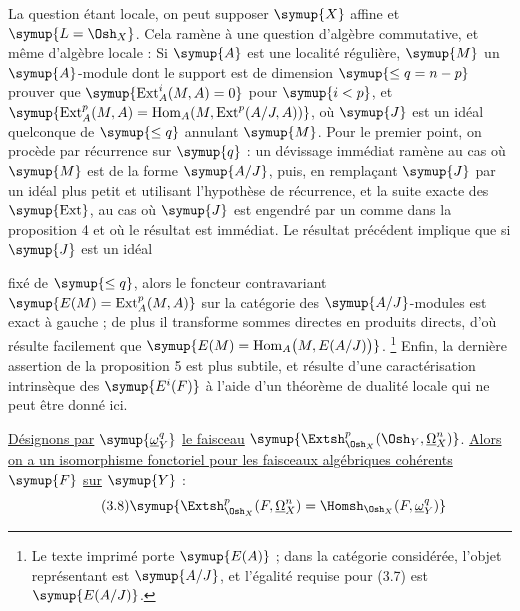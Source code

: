 La question étant locale, on peut supposer $\symup{X}$ affine et $\symup{L=\Osh_X}$. Cela ramène
à une question d'algèbre commutative, et même d'algèbre locale : Si $\symup{A}$ est une
localité régulière, $\symup{M}$ un $\symup{A}$-module dont le support est de dimension
$\symup{\leq q=n-p}$ prouver que $\symup{\operatorname{Ext}_{A}^{i}(M,A)=0}$ pour $\symup{i<p}$, et
$\symup{\operatorname{Ext}_{A}^{p}(M,A)
=\operatorname{Hom}_{A}\!\left(M,\operatorname{Ext}^{p}(A/J,A)\right)}$,
où $\symup{J}$ est un idéal quelconque de  $\symup{\leq q}$ annulant $\symup{M}$. Pour le
premier point, on procède par récurrence sur $\symup{q}$ : un dévissage immédiat ramène
au cas où $\symup{M}$ est de la forme $\symup{A/J}$, puis, en remplaçant $\symup{J}$ par un idéal plus
petit et utilisant l'hypothèse de récurrence, et la suite exacte des
$\symup{\operatorname{Ext}}$, au cas où $\symup{J}$ est engendré par un 
comme dans la proposition 4 et où le résultat est immédiat. Le résultat
précédent implique que si $\symup{J}$ est un idéal

fixé de  $\symup{\leq q}$, alors le foncteur contravariant
$\symup{E(M)=\operatorname{Ext}_{A}^{p}(M,A)}$ sur la catégorie des $\symup{A/J}$-modules est
exact à gauche ; de plus il transforme sommes directes en produits directs,
d'où résulte facilement que
$\symup{E(M)=\operatorname{Hom}_{A}\bigl(M,E(A/J)\bigr)}$.
\footnote{Le texte imprimé porte $\symup{E(A)}$ ; dans la catégorie considérée, l'objet
représentant est $\symup{A/J}$, et l'égalité requise pour (3.7) est $\symup{E(A/J)}$.} Enfin, la
dernière assertion de la proposition 5 est plus subtile, et résulte d'une
caractérisation intrinsèque des $\symup{E^{i}(F)}$ à l'aide d'un théorème de dualité
locale qui ne peut être donné ici.

 \uline{Désignons par} $\symup{\underline{\omega}_Y^{q}}$ \uline{le faisceau}
$\symup{\Extsh_{\Osh_X}^{p}(\Osh_Y,\underline{\Omega}_X^{n})}$. \uline{Alors on a un isomorphisme
fonctoriel pour les faisceaux algébriques cohérents} $\symup{F}$ \uline{sur} $\symup{Y}$ :
\begin{equation}\tag{3.8}
  \symup{\Extsh_{\Osh_X}^{p}(F,\underline{\Omega}_X^{n})
  =\Homsh_{\Osh_X}(F,\underline{\omega}_Y^{q})}
\end{equation}


